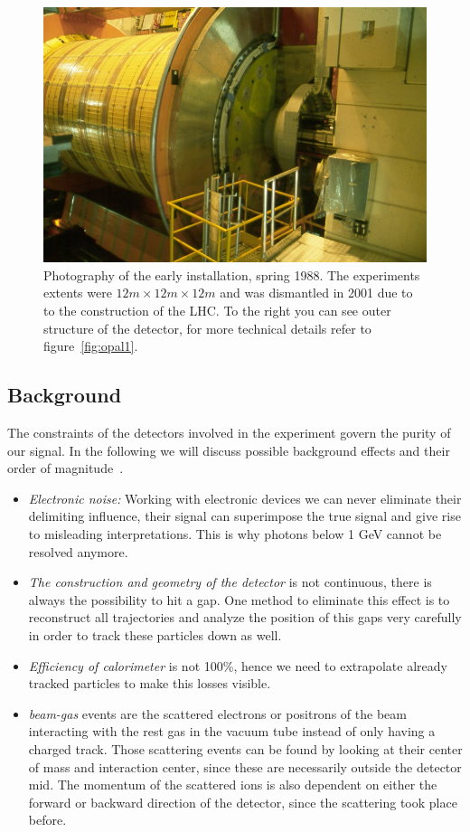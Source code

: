 \begin{figure}[htpb]
    \centering
    \includegraphics[width=1.0\linewidth]{figures/opal_photo}
    \caption{Photography of the early installation, spring 1988\cite{CERN_OPAL}. The experiments extents were
    $12m \times 12m \times 12m$ and was dismantled in 2001 due to to the construction of the LHC. To the right you can 
see outer structure of the detector, for more technical details refer to figure~\ref{fig:opal1}. }
    \label{fig:opal_photo}
\end{figure}
\subsection{Background}
\label{sub:background}
The constraints of the detectors involved in the experiment govern the purity of our signal. In the following we will
discuss possible background effects and their order of magnitude~\cite{ver}.
\begin{itemize}
    \item \textit{Electronic noise:} Working with electronic devices we can never eliminate their delimiting influence, 
        their signal
        can superimpose the true signal and give rise to misleading interpretations. This is why photons below 1 GeV cannot
        be resolved anymore.
    \item \textit{The construction and geometry of the detector} is not continuous, there is always the possibility to hit a gap.
        One method to eliminate this effect is to reconstruct all trajectories and analyze the position of this gaps very
        carefully in order to track these particles down as well.
    \item \textit{Efficiency of calorimeter} is not 100\%, hence we need to extrapolate already tracked particles to make
    this losses visible.
\item \textit{beam-gas} events are the scattered electrons or positrons of the beam interacting with the rest gas in the vacuum
    tube instead of only
    having a charged track. Those scattering events can be found by looking at their center of mass and interaction center,
    since these are necessarily outside the detector mid. The momentum of the scattered ions is also dependent on either
    the forward or backward direction of the detector, since the scattering took place before.
\end{itemize}



